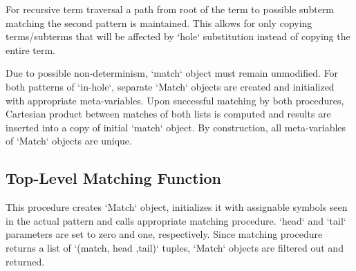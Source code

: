 For recursive term traversal a path from root of the term to possible subterm matching the second pattern is maintained. This allows for only copying terms/subterms that will be affected by `hole` substitution instead of copying the entire term.

Due to possible non-determinism, `match` object must remain unmodified. For both patterns of `in-hole`, separate `Match` objects are created and initialized with appropriate meta-variables. Upon successful matching by both procedures, Cartesian product between matches of both lists is computed and results are inserted into a copy of initial `match` object. By construction, all meta-variables of `Match` objects are unique.


\subsection{Top-Level Matching Function}

This procedure creates `Match` object, initializes it with assignable symbols seen in the actual pattern and calls appropriate matching procedure. `head` and `tail` parameters are set to zero and one, respectively. Since matching procedure returns a list of `(match, head ,tail)` tuples, `Match` objects are filtered out and returned.

